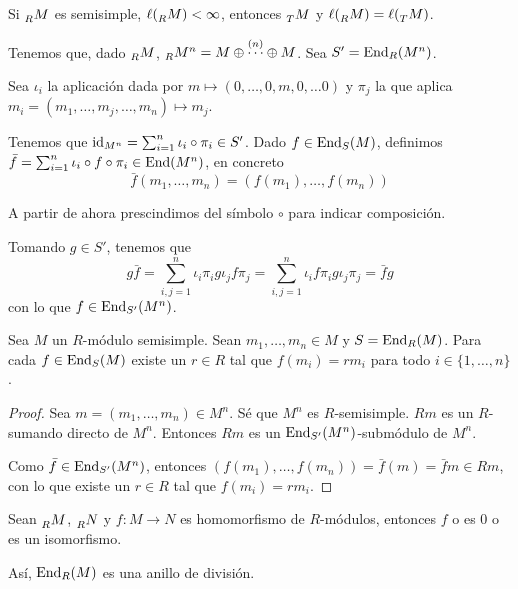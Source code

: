 
\begin{cor}
  Si \(\prescript{}{R}{M}\) es semisimple,
  \(\ell(\prescript{}{R}{M})<\infty\), entonces \(\prescript{}{T}{M}\)
  y \(\ell(\prescript{}{R}{M})=\ell(\prescript{}{T}{M})\).
\end{cor}

Tenemos que, dado \(\prescript{}{R}{M}\),
\(\prescript{}{R}{M}^n=M\oplus\overset{(n)}{\cdots}\oplus M\).
Sea \(S'=\operatorname{End}_R(M^n)\).

Sea \(\iota_i\) la aplicación dada por \(m\mapsto(0,\ldots,0,m,0,\ldots0)\) y
\(\pi_j\) la que aplica \(m_i=(m_1,\ldots, m_j,\ldots, m_n)\mapsto m_j\).

Tenemos que \(\operatorname{id}_{M^n}=\sum_{i=1}^n\iota_i\circ\pi_i\in S'\).
Dado \(f\in\operatorname{End}_S(M)\), definimos \(\bar{f}=\sum_{i=1}^n\iota_i\circ
f\circ\pi_i\in\operatorname{End}(M^n)\), en concreto
\[
  \bar{f}(m_1,\ldots, m_n)=(f(m_1),\ldots,f(m_n))
\]

A partir de ahora prescindimos del símbolo \(\circ\) para indicar composición.

Tomando \(g\in S'\), tenemos que
\[
  g\bar{f}=\sum_{i,j=1}^n \iota_i\pi_i g \iota_j f\pi_j
  =\sum_{i,j=1}^n \iota_i f\pi_i g\iota_j\pi_j=\bar{f}g
\]
con lo que \(f\in \operatorname{End}_{S'}(M^n)\).

\begin{teo}
  Sea \(M\) un \(R\)-módulo semisimple. Sean \(m_1,\ldots, m_n\in M\)
  y \(S=\operatorname{End}_R(M)\). Para cada \(f\in\operatorname{End}_S(M)\) existe un \(r\in R\)
  tal que \(f(m_i)=rm_i\) para todo \(i\in\{1,\ldots,n\}\).
\end{teo}
\begin{proof}
  Sea \(m=(m_1,\ldots, m_n)\in M^n\). Sé que \(M^n\) es \(R\)-semisimple.
  \(
    Rm
  \) es un \(R\)-sumando directo de \(M^n\). Entonces \(Rm\) es un
  \(\operatorname{End}_{S'}(M^n)\)-submódulo de \(M^n\).

  Como \(\bar{f}\in\operatorname{End}_{S'}(M^n)\), entonces
  \((f(m_1),\ldots,f(m_n))=\bar{f}(m)=\bar{f} m\in Rm\), con lo que
  existe un \(r\in R\) tal que \(f(m_i)=rm_i\).

\end{proof}

\begin{lema}[de Schur]
  Sean \(\prescript{}{R}{M}\), \(\prescript{}{R}{N}\) y
  \(f:M\longrightarrow N\) es homomorfismo de \(R\)-módulos,
  entonces \(f\) o es 0 o es un isomorfismo.

  Así, \(\operatorname{End}_R(M)\) es una anillo de división.
\end{lema}


